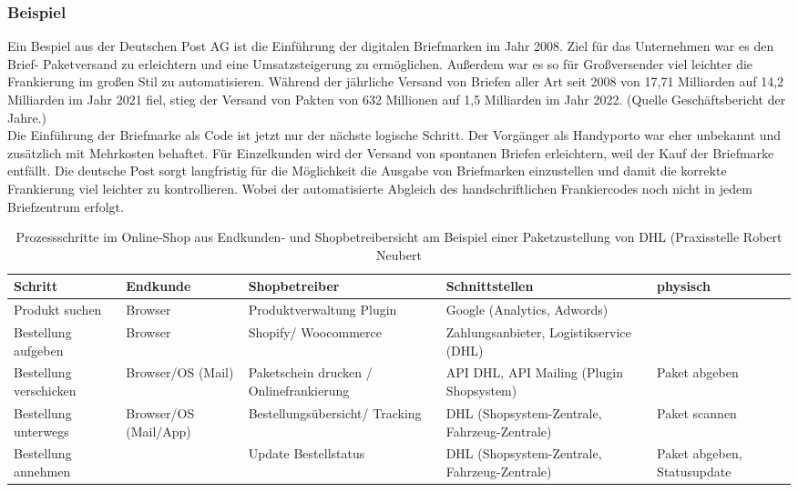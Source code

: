 \documentclass[notitlepage, hidelinks]{article}
\begin{document}
\subsubsection{Beispiel}
Ein Bespiel aus der Deutschen Post AG ist die Einführung der digitalen Briefmarken im Jahr 2008. Ziel für das Unternehmen war es den Brief- Paketversand zu erleichtern und eine Umsatzsteigerung zu ermöglichen. Außerdem war es so für Großversender viel leichter die Frankierung im großen Stil zu automatisieren. Während der jährliche Versand von Briefen aller Art seit 2008 von 17,71 Milliarden auf 14,2 Milliarden im Jahr 2021 fiel, stieg der Versand von Pakten von 632 Millionen auf 1,5 Milliarden im Jahr 2022. (Quelle Geschäftsbericht der Jahre.) \\
Die Einführung der Briefmarke als Code ist jetzt nur der nächste logische Schritt. Der Vorgänger als Handyporto war eher unbekannt und zusätzlich mit Mehrkosten behaftet. Für Einzelkunden wird der Versand von spontanen Briefen erleichtern, weil der Kauf der Briefmarke entfällt. Die deutsche Post sorgt langfristig für die Möglichkeit die Ausgabe von Briefmarken einzustellen und damit die korrekte Frankierung viel leichter zu kontrollieren. Wobei der automatisierte Abgleich des handschriftlichen Frankiercodes noch nicht in jedem Briefzentrum erfolgt.

\begin{table}[H]
\centering
\begin{tabular}{|L{2cm}|L{2.8cm}|L{2.8cm}|L{2.8cm}|L{2.8cm}|}
\hline
Schritt & Endkunde & Shopbetreiber & Schnittstellen & physisch \\ \hline
Produkt suchen & Browser & Produktverwaltung Plugin & Google (Analytics, Adwords) & \\ \hline
Bestellung aufgeben & Browser & Shopify/ Woocommerce & Zahlungsanbieter, Logistikservice (DHL) & \\ \hline
Bestellung verschicken & Browser/OS (Mail) & Paketschein drucken / Onlinefrankierung & API DHL, API Mailing (Plugin Shopsystem) & Paket abgeben \\ \hline
Bestellung unterwegs & Browser/OS (Mail/App) & Bestellungsübersicht/ Tracking & DHL (Shopsystem-Zentrale, Fahrzeug-Zentrale) & Paket scannen \\ \hline
Bestellung annehmen & & Update Bestellstatus & DHL (Shopsystem-Zentrale, Fahrzeug-Zentrale) & Paket abgeben, Statusupdate \\ \hline
\end{tabular}
\caption{Prozessschritte im Online-Shop aus Endkunden- und Shopbetreibersicht am Beispiel einer Paketzustellung von DHL (Praxisstelle Robert Neubert}
\end{table}
\end{document}
